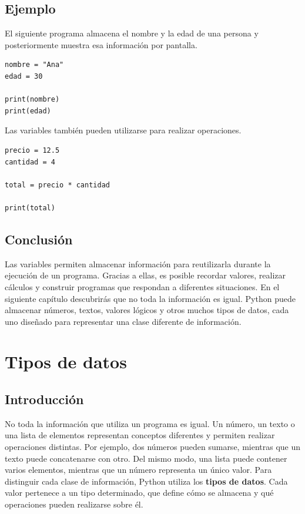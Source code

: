 \documentclass[11pt,a5paper,twoside]{book}
\begin{document}
\subsection{Ejemplo}
El siguiente programa almacena el nombre y la edad de una persona y posteriormente muestra esa información por pantalla.


\begin{tcolorbox}
\scriptsize
 \begin{verbatim}
nombre = "Ana"
edad = 30

print(nombre)
print(edad)
\end{verbatim}
\end{tcolorbox}
Las variables también pueden utilizarse para realizar operaciones.


\begin{tcolorbox}
\scriptsize
 \begin{verbatim}
precio = 12.5
cantidad = 4

total = precio * cantidad

print(total)
\end{verbatim}
\end{tcolorbox}
\subsection{Conclusión}
Las variables permiten almacenar información para reutilizarla durante la ejecución de un programa. Gracias a ellas, es posible recordar valores, realizar cálculos y construir programas que respondan a diferentes situaciones.
En el siguiente capítulo descubrirás que no toda la información es igual. Python puede almacenar números, textos, valores lógicos y otros muchos tipos de datos, cada uno diseñado para representar una clase diferente de información.

\newpage

\section{Tipos de datos}
\subsection{Introducción}
No toda la información que utiliza un programa es igual. Un número, un texto o una lista de elementos representan conceptos diferentes y permiten realizar operaciones distintas.
Por ejemplo, dos números pueden sumarse, mientras que un texto puede concatenarse con otro. Del mismo modo, una lista puede contener varios elementos, mientras que un número representa un único valor.
Para distinguir cada clase de información, Python utiliza los \textbf{tipos de datos}. Cada valor pertenece a un tipo determinado, que define cómo se almacena y qué operaciones pueden realizarse sobre él.
\end{document}
